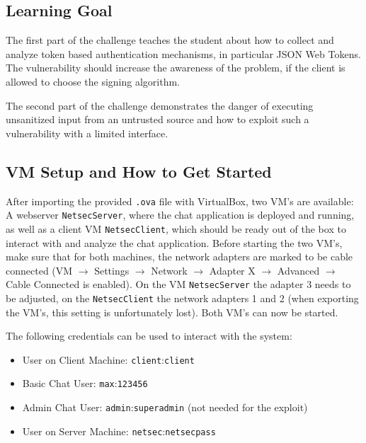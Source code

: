 \documentclass[12pt,a4paper]{article}
\newcommand{\code}[1]{\texttt{#1}}
\begin{document}
\subsection{Learning Goal}

The first part of the challenge teaches the student about how to collect and analyze token based authentication mechanisms, in particular JSON Web Tokens. The vulnerability should increase the awareness of the problem, if the client is allowed to choose the signing algorithm.

The second part of the challenge demonstrates the danger of executing unsanitized input from an untrusted source and how to exploit such a vulnerability with a limited interface.

\subsection{VM Setup and How to Get Started}
After importing the provided \code{.ova} file with VirtualBox, two VM's are available: A webserver \code{NetsecServer}, where the chat application is deployed and running, as well as a client VM \code{NetsecClient}, which should be ready out of the box to interact with and analyze the chat application. Before starting the two VM's, make sure that for both machines, the network adapters are marked to be cable connected (VM $\rightarrow$ Settings $\rightarrow$ Network $\rightarrow$ Adapter X $\rightarrow$ Advanced $\rightarrow$ Cable Connected is enabled). On the VM \code{NetsecServer} the adapter 3 needs to be adjusted, on the \code{NetsecClient} the network adapters 1 and 2 (when exporting the VM's, this setting is unfortunately lost). Both VM's can now be started.

The following credentials can be used to interact with the system:
\begin{itemize}
	\item User on Client Machine: \code{client}:\code{client}
	\item Basic Chat User: \code{max}:\code{123456}
	\item Admin Chat User: \code{admin}:\code{superadmin} (not needed for the exploit)
	\item User on Server Machine: \code{netsec}:\code{netsecpass}
\end{itemize}
\end{document}
